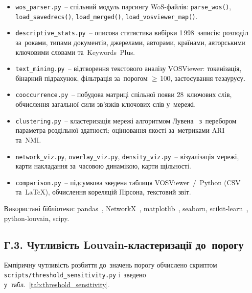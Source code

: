 \begin{itemize}\itemsep0pt
    \item \texttt{wos\_parser.py}~-- спільний модуль парсингу WoS-файлів: \texttt{parse\_wos()}, \texttt{load\_savedrecs()}, \texttt{load\_merged()}, \texttt{load\_vosviewer\_map()}.
    \item \texttt{descriptive\_stats.py}~-- описова статистика вибірки 1\,998~записів: розподіл за~роками, типами документів, джерелами, авторами, країнами, авторськими ключовими словами та~Keywords~Plus.
    \item \texttt{text\_mining.py}~-- відтворення текстового аналізу VOSViewer: токенізація, бінарний підрахунок, фільтрація за~порогом $\geq$\,100, застосування тезаурусу.
    \item \texttt{cooccurrence.py}~-- побудова матриці спільної появи 28~ключових слів, обчислення загальної сили зв'язків ключових слів у~мережі.
    \item \texttt{clustering.py}~-- кластеризація мережі алгоритмом Лувена~\cite{Blondel2008} з~перебором параметра роздільної здатності; оцінювання якості за~метриками ARI~\cite{Hubert1985} та~NMI.
    \item \texttt{network\_viz.py}, \texttt{overlay\_viz.py}, \texttt{density\_viz.py}~-- візуалізація мережі, карти накладання за~часовою динамікою, карти щільності.
    \item \texttt{comparison.py}~-- підсумкова зведена таблиця VOSViewer~/~Python (CSV та~LaTeX), обчислення кореляцій Пірсона, текстовий звіт.
\end{itemize}

Використані бібліотеки: pandas~\cite{McKinney2010}, NetworkX~\cite{Hagberg2008}, matplotlib~\cite{Hunter2007}, seaborn, scikit-learn~\cite{Pedregosa2011}, python-louvain, scipy.

\subsection*{Г.3. Чутливість Louvain-кластеризації до~порогу}
\label{app:bibliometric-sensitivity}

Емпіричну чутливість розбиття до~значень порогу обчислено скриптом \texttt{scripts/threshold\_sensitivity.py} і~зведено у~табл.~\ref{tab:threshold_sensitivity}.

